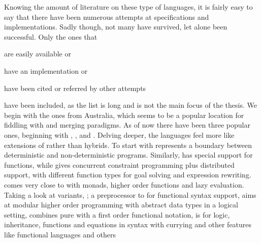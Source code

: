 \documentclass[thesis-solanki.tex]{subfiles}
\begin{document}
Knowing the amount of literature  on these type of languages, it is fairly easy to say that there have been numerous 
attempts at specifications and implementations.
Sadly though, not many have survived, let alone been successful.
Only the ones that
\begin{inparaenum}[(a)]
\item
  are easily available or
\item
  have an implementation or
\item
  have been cited or referred by other attempts
\end{inparaenum}
have been included, as the list is long and is not the main focus of the thesis.
We begin
with the ones from Australia, which seems to be a popular location for fiddling with
 and merging paradigms.
As of now there have been three popular ones, beginning with , \cite{website:nue-prolog},
 \cite{website:oz-mozart} and  \cite{website:mercury}.
Delving deeper, the languages feel more like extensions of  rather than hybrids.
To start with  represents a boundary between deterministic and
non-deterministic programs. Similarly,
has special support for functions, while  gives concurrent constraint programming
plus distributed support, with different function types for goal solving and expression rewriting.
 \cite{lloyd1999programming:escher} comes very close to  with monads, higher
order functions and lazy evaluation.
Taking a look at  variants,  \cite{website:ciao}; a preprocessor to
 for functional syntax support,  \cite{website:lambda-prolog} aims at
modular higher order programming with abstract data types in a logical setting, 
\cite{website:babel,moreno1992logic, moreno1988babel} combines pure  with a first order functional
notation,  \cite{website:life} is for  logic, inheritance, functions and equations in
 syntax with currying and other features like functional languages and others
\end{document}
